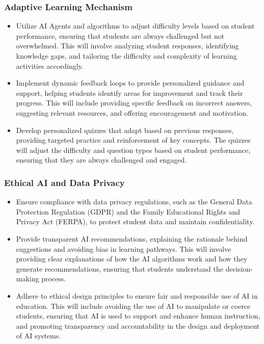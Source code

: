 \documentclass[
	letterpaper, %
]{jdf}
\begin{document}
\subsubsection{Adaptive Learning Mechanism}
\begin{itemize}
    \item Utilize AI Agents and algorithms to adjust difficulty levels based on student performance, ensuring that students are always challenged but not overwhelmed. This will involve analyzing student responses, identifying knowledge gaps, and tailoring the difficulty and complexity of learning activities accordingly.
    \item Implement dynamic feedback loops to provide personalized guidance and support, helping students identify areas for improvement and track their progress. This will include providing specific feedback on incorrect answers, suggesting relevant resources, and offering encouragement and motivation.
    \item Develop personalized quizzes that adapt based on previous responses, providing targeted practice and reinforcement of key concepts. The quizzes will adjust the difficulty and question types based on student performance, ensuring that they are always challenged and engaged.
\end{itemize}

\subsubsection{Ethical AI and Data Privacy}
\begin{itemize}
    \item Ensure compliance with data privacy regulations, such as the General Data Protection Regulation (GDPR) and the Family Educational Rights and Privacy Act (FERPA), to protect student data and maintain confidentiality.
    \item Provide transparent AI recommendations, explaining the rationale behind suggestions and avoiding bias in learning pathways. This will involve providing clear explanations of how the AI algorithms work and how they generate recommendations, ensuring that students understand the decision-making process.
    \item Adhere to ethical design principles to ensure fair and responsible use of AI in education. This will include avoiding the use of AI to manipulate or coerce students, ensuring that AI is used to support and enhance human instruction, and promoting transparency and accountability in the design and deployment of AI systems.
\end{itemize}
\end{document}
